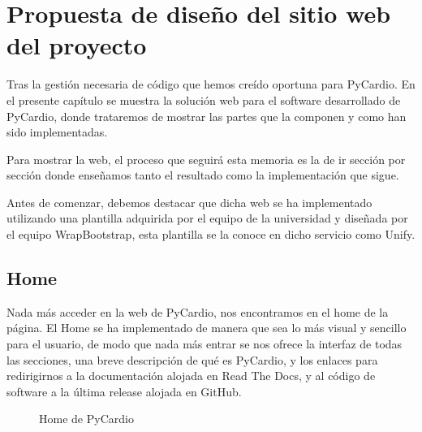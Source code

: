 \chapter{Propuesta de diseño del sitio web del proyecto}
\label{chap:webProp}
Tras la gestión necesaria de código que hemos creído oportuna para PyCardio. En el presente capítulo se muestra la solución web para el software desarrollado de PyCardio, donde trataremos de mostrar las partes que la componen y como han sido implementadas.

Para mostrar la web, el proceso que seguirá esta memoria es la de ir sección por sección donde enseñamos tanto el resultado como la implementación que sigue.

Antes de comenzar, debemos destacar que dicha web se ha implementado utilizando una plantilla adquirida por el equipo de la universidad y diseñada por el equipo WrapBootstrap, esta plantilla se la conoce en dicho servicio como Unify. 

\section{Home}
\label{sec:homeWeb}
Nada más acceder en la web de PyCardio, nos encontramos en el home de la página. El Home se ha implementado de manera que sea lo más visual y sencillo para el usuario, de modo que nada más entrar se nos ofrece la interfaz de todas las secciones, una breve descripción de qué es PyCardio, y los enlaces para redirigirnos a la documentación alojada en Read The Docs, y al código de software a la última release alojada en GitHub. 

\begin{figure}[H]
    \centering
    \caption{Home de PyCardio}
    \label{fig:homePyCardio}
\end{figure}

